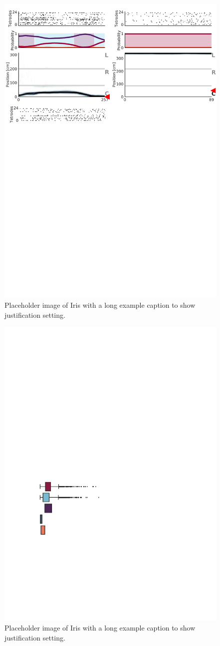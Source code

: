 \documentclass[times, twoside]{zHenriquesLab-StyleBioRxiv}
\begin{document}
\begin{figure}%
\centering
\includegraphics[width=0.80\linewidth]{figures/Figure3/Figure3_v3}
\caption{Placeholder image of Iris with a long example caption to show justification setting.}
\label{Figure3}
\end{figure}

\begin{figure}%
\centering
\includegraphics[width=0.80\linewidth]{figures/Figure4/Figure4_v2}
\caption{Placeholder image of Iris with a long example caption to show justification setting.}
\label{Figure4}
\end{figure}
\end{document}
